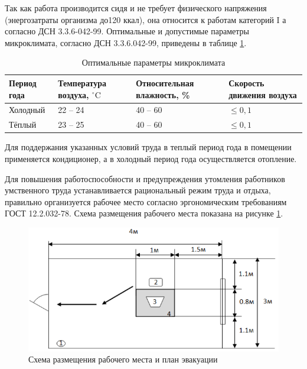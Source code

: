 Так как работа производится сидя и не требует физического напряжения (энергозатраты организма до120 ккал),
она относится к работам категорий I а согласно ДСН 3.3.6-042-99. Оптимальные и допустимые параметры микроклимата,
согласно ДСН 3.3.6.042-99, приведены в таблице \ref{tab:clima}.
\begin{table}[!ht]
    \centering
    \caption{Оптимальные параметры микроклимата}
    \label{tab:clima}

    \begin{tabular}{|p{2.5cm}|p{4.5cm}|p{4cm}|p{4cm}|}
\hline
Период года & Температура воздуха, \(^{\circ}\mathrm{C}\) & Относительная влажность, \% & Скорость движения воздуха \\
\hline
Холодный    & 22 -- 24                                    & 40 -- 60                    & \(\le 0,1\) \\
\hline
Тёплый      & 23 -- 25                                    & 40 -- 60                    & \(\le 0,1 \) \\
\hline
    \end{tabular}
\end{table}
Для поддержания указанных условий труда в теплый период года в помещении применяется кондиционер,
а в холодный период года осуществляется отопление. 

Для повышения работоспособности и предупреждения утомления работников умственного труда  устанавливается
рациональный режим труда и отдыха, правильно организуется рабочее место согласно эргономическим  требованиям
ГОСТ 12.2.032-78. Схема размещения рабочего места показана на рисунке \ref{fig:workplace}.

\begin{figure}[!ht]
    \centering
    \includegraphics[scale=0.5]{graphics/workplace.png}
    \caption{Схема размещения рабочего места и план эвакуации}
    \label{fig:workplace}
\end{figure}


